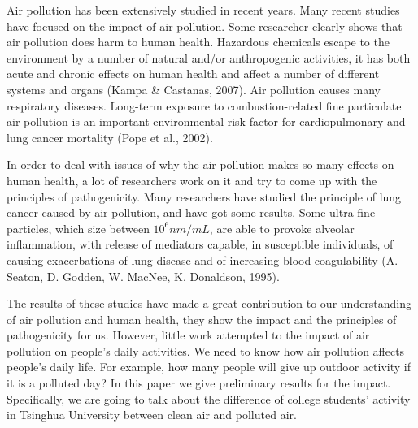 Air pollution has been extensively studied in recent years. Many recent studies have focused on the impact of air pollution. Some researcher clearly shows that air pollution does harm to human health. Hazardous chemicals escape to the environment by a number of natural and/or anthropogenic activities, it has both acute and chronic effects on human health and affect a number of different systems and organs (Kampa \& Castanas, 2007). Air pollution causes many  respiratory diseases. Long-term exposure to combustion-related fine particulate air pollution is an important environmental risk factor for cardiopulmonary and lung cancer mortality (Pope et al., 2002). 

In order to deal with issues of why the air pollution makes so many effects on human health, a lot of researchers work on it and try to come up with the principles of pathogenicity. Many researchers have studied the principle of lung cancer caused by air pollution, and have got some results. Some ultra-fine particles, which size between $10^6nm/mL$, are able to provoke alveolar inflammation, with release of mediators capable, in susceptible individuals, of causing exacerbations of lung disease and of increasing blood coagulability (A. Seaton, D. Godden, W. MacNee, K. Donaldson, 1995). 

The results of these studies have made a great contribution to our understanding of air pollution and human health, they show the impact and the principles of pathogenicity for us. However, little work attempted to the impact of air pollution on people’s daily activities. We need to know how air pollution affects people's daily life. For example, how many people will give up outdoor activity if it is a polluted day? In this paper we give preliminary results for the impact. Specifically, we are going to talk about the difference of college students’ activity in Tsinghua University between clean air and polluted air. 
